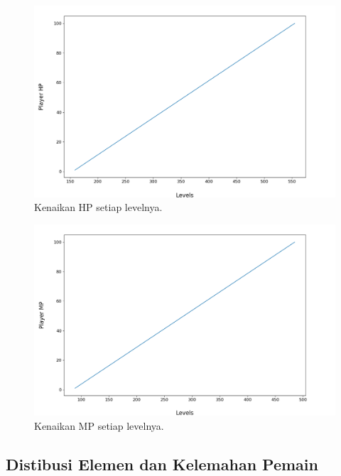 \begin{figure} [!h] \centering
	\includegraphics[scale=0.45]{img/PlayerHpDistrib.png}
	\caption{Kenaikan HP setiap levelnya.}
	\vspace{-2ex}
	\label{fig:hp_player_1}
\end{figure}

\begin{figure} [!h] \centering
	\includegraphics[scale=0.45]{img/PlayerMpDistrib.png}
	\caption{Kenaikan MP setiap levelnya.}
	\vspace{-2ex}
	\label{fig:mp_player_1}
\end{figure}

\subsection{Distibusi Elemen dan Kelemahan Pemain}
\label{sec:sub_sec4_eval_dist_element_multi-character}
\vspace{1ex}

